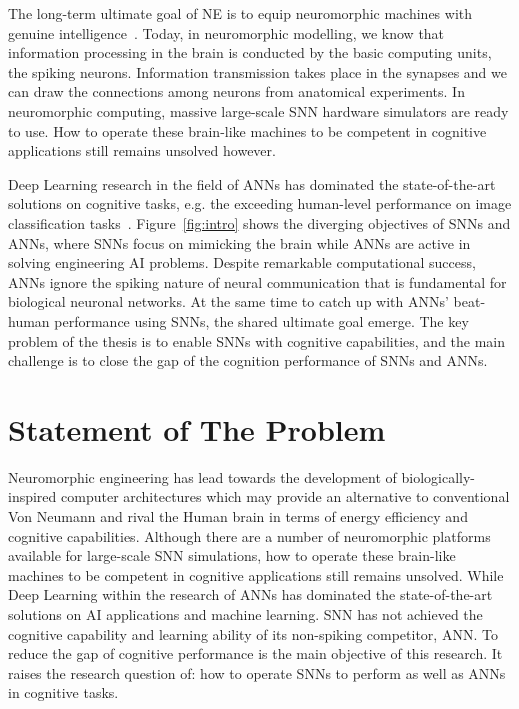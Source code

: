 The long-term ultimate goal of NE is to equip neuromorphic machines with genuine intelligence~\cite{konar1999artificial}.
Today, in neuromorphic modelling, we know that information processing in the brain is conducted by the basic computing units, the spiking neurons.
Information transmission takes place in the synapses and we can draw the connections among neurons from anatomical experiments.
In neuromorphic computing, massive large-scale SNN hardware simulators are ready to use.
How to operate these brain-like machines to be competent in cognitive applications still remains unsolved however.

Deep Learning research in the field of ANNs has dominated the state-of-the-art solutions on cognitive tasks, e.g. the exceeding human-level performance on image classification tasks~\cite{he2015delving}.
Figure~\ref{fig:intro} shows the diverging objectives of SNNs and ANNs, where SNNs focus on mimicking the brain while ANNs are active in solving engineering AI problems.
Despite remarkable computational success, ANNs ignore the spiking nature of neural communication that is fundamental for biological neuronal networks.
At the same time to catch up with ANNs' beat-human performance using SNNs, the shared ultimate goal emerge.
The key problem of the thesis is to enable SNNs with cognitive capabilities, and the main challenge is to close the gap of the cognition performance of SNNs and ANNs.




\section{Statement of The Problem}
\label{sec:state_problem}
Neuromorphic engineering has lead towards the development of biologically-inspired computer architectures which may provide an alternative to conventional Von Neumann and rival the Human brain in terms of energy efficiency and cognitive capabilities.
Although there are a number of neuromorphic platforms available for large-scale SNN simulations, how to operate these brain-like machines to be competent in cognitive applications still remains unsolved.
While Deep Learning within the research of ANNs has dominated the state-of-the-art solutions on AI applications and machine learning.
SNN has not achieved the cognitive capability and learning ability of its non-spiking competitor, ANN.
To reduce the gap of cognitive performance is the main objective of this research.
It raises the research question of: how to operate SNNs to perform as well as ANNs in cognitive tasks.

